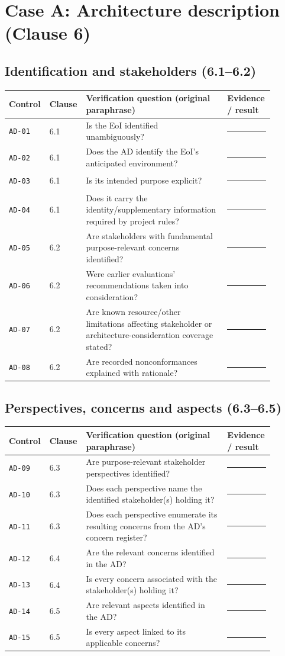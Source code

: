 \documentclass[11pt,letterpaper]{article}
\newcommand{\AuditingHead}{\begin{longtable}{p{0.10\linewidth}p{0.10\linewidth}p{0.52\linewidth}p{0.17\linewidth}}\toprule\textbf{Control}&\textbf{Clause}&\textbf{Verification question (original paraphrase)}&\textbf{Evidence / result}\\\midrule\endhead}
\newcommand{\AuditingEnd}{\bottomrule\end{longtable}}
\newcommand{\AuditRow}[4]{\texttt{#1} & #2 & #3 & #4\\}
\begin{document}
\section{Case A: Architecture description (Clause 6)}
\subsection{Identification and stakeholders (6.1--6.2)}
\AuditingHead
\AuditRow{AD-01}{6.1}{Is the EoI identified unambiguously?}{\rule[-0.4em]{0pt}{2em}\rule{0.60\linewidth}{0.4pt}}
\AuditRow{AD-02}{6.1}{Does the AD identify the EoI's anticipated environment?}{\rule[-0.4em]{0pt}{2em}\rule{0.60\linewidth}{0.4pt}}
\AuditRow{AD-03}{6.1}{Is its intended purpose explicit?}{\rule[-0.4em]{0pt}{2em}\rule{0.60\linewidth}{0.4pt}}
\AuditRow{AD-04}{6.1}{Does it carry the identity/supplementary information required by project rules?}{\rule[-0.4em]{0pt}{2em}\rule{0.60\linewidth}{0.4pt}}
\AuditRow{AD-05}{6.2}{Are stakeholders with fundamental purpose-relevant concerns identified?}{\rule[-0.4em]{0pt}{2em}\rule{0.60\linewidth}{0.4pt}}
\AuditRow{AD-06}{6.2}{Were earlier evaluations' recommendations taken into consideration?}{\rule[-0.4em]{0pt}{2em}\rule{0.60\linewidth}{0.4pt}}
\AuditRow{AD-07}{6.2}{Are known resource/other limitations affecting stakeholder or architecture-consideration coverage stated?}{\rule[-0.4em]{0pt}{2em}\rule{0.60\linewidth}{0.4pt}}
\AuditRow{AD-08}{6.2}{Are recorded nonconformances explained with rationale?}{\rule[-0.4em]{0pt}{2em}\rule{0.60\linewidth}{0.4pt}}
\AuditingEnd
\subsection{Perspectives, concerns and aspects (6.3--6.5)}
\AuditingHead
\AuditRow{AD-09}{6.3}{Are purpose-relevant stakeholder perspectives identified?}{\rule[-0.4em]{0pt}{2em}\rule{0.60\linewidth}{0.4pt}}
\AuditRow{AD-10}{6.3}{Does each perspective name the identified stakeholder(s) holding it?}{\rule[-0.4em]{0pt}{2em}\rule{0.60\linewidth}{0.4pt}}
\AuditRow{AD-11}{6.3}{Does each perspective enumerate its resulting concerns from the AD's concern register?}{\rule[-0.4em]{0pt}{2em}\rule{0.60\linewidth}{0.4pt}}
\AuditRow{AD-12}{6.4}{Are the relevant concerns identified in the AD?}{\rule[-0.4em]{0pt}{2em}\rule{0.60\linewidth}{0.4pt}}
\AuditRow{AD-13}{6.4}{Is every concern associated with the stakeholder(s) holding it?}{\rule[-0.4em]{0pt}{2em}\rule{0.60\linewidth}{0.4pt}}
\AuditRow{AD-14}{6.5}{Are relevant aspects identified in the AD?}{\rule[-0.4em]{0pt}{2em}\rule{0.60\linewidth}{0.4pt}}
\AuditRow{AD-15}{6.5}{Is every aspect linked to its applicable concerns?}{\rule[-0.4em]{0pt}{2em}\rule{0.60\linewidth}{0.4pt}}
\AuditingEnd
\end{document}
